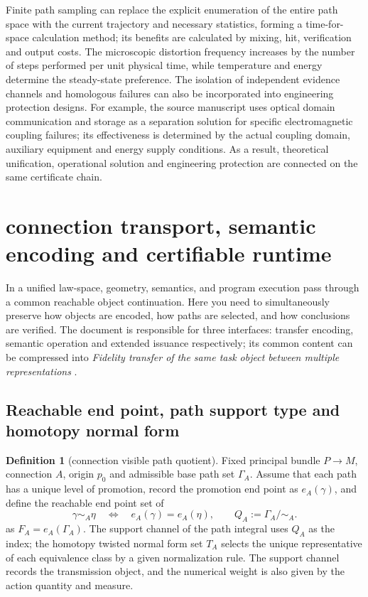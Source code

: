 \documentclass[11pt,a4paper]{article}
\theoremstyle{plain}
\theoremstyle{definition}
\newtheorem{definition}[theorem]{Definition}
\theoremstyle{remark}
\begin{document}
\begin{CJK*}
Finite path sampling can replace the explicit enumeration of the entire path space with the current trajectory and necessary statistics, forming a time-for-space calculation method; its benefits are calculated by mixing, hit, verification and output costs. The microscopic distortion frequency increases by the number of steps performed per unit physical time, while temperature and energy determine the steady-state preference. The isolation of independent evidence channels and homologous failures can also be incorporated into engineering protection designs. For example, the source manuscript uses optical domain communication and storage as a separation solution for specific electromagnetic coupling failures; its effectiveness is determined by the actual coupling domain, auxiliary equipment and energy supply conditions. As a result, theoretical unification, operational solution and engineering protection are connected on the same certificate chain. \cite{S16}

\section { connection transport, semantic encoding and certifiable runtime }\label{ss:semantic}


In a unified law-space, geometry, semantics, and program execution pass through a common reachable object continuation. Here you need to simultaneously preserve how objects are encoded, how paths are selected, and how conclusions are verified. The document \cite{S19,S20,S22} is responsible for three interfaces: transfer encoding, semantic operation and extended issuance respectively; its common content can be compressed into \emph { Fidelity transfer of the same task object between multiple representations }.

\subsection { Reachable end point, path support type and homotopy normal form }

\begin{definition}
[connection visible path quotient]Fixed principal bundle $P\to M$, connection $A$, origin $p_0$ and admissible base path set $\Gamma_A$. Assume that each path has a unique level of promotion, record the promotion end point as $e_A(\gamma)$, and define the reachable end point set of \[
 \gamma\sim_A\eta\quad\Longleftrightarrow\quad e_A(\gamma)=e_A(\eta),
 \qquad Q_A:=\Gamma_A/\sim_A.
\] as $F_A=e_A(\Gamma_A)$. The support channel of the path integral uses $Q_A$ as the index; the homotopy twisted normal form set $T_A$ selects the unique representative of each equivalence class by a given normalization rule. The support channel records the transmission object, and the numerical weight is also given by the action quantity and measure.\end{definition}



\end{CJK*}
\end{document}
